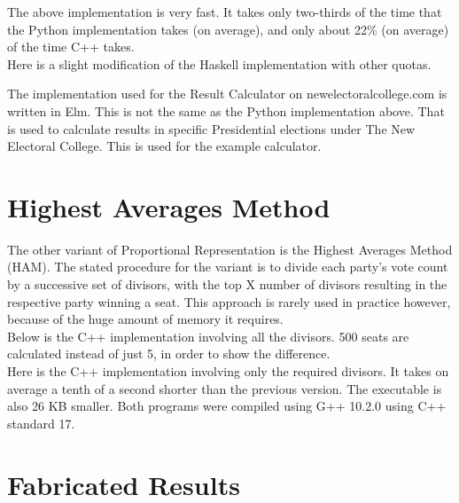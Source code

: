 \documentclass{article}
\begin{document}
    

    The above implementation is very fast. It takes only two-thirds of the time that the Python implementation takes (on average), and only about 22\% (on average) of the time C++ takes.\\

    Here is a slight modification of the Haskell implementation with other quotas.

    

    The implementation used for the Result Calculator on newelectoralcollege.com is written in Elm. This is not the same as the Python implementation above. That is used to calculate results in specific Presidential elections under The New Electoral College. This is used for the example calculator.

    

    \section{Highest Averages Method}

    The other variant of Proportional Representation is the Highest Averages Method (HAM). The stated procedure for the variant is to divide each party's vote count by a successive set of divisors, with the top X number of divisors resulting in the respective party winning a seat. This approach is rarely used in practice however, because of the huge amount of memory it requires. \\

    Below is the C++ implementation involving all the divisors. 500 seats are calculated instead of just 5, in order to show the difference. \\

    

    Here is the C++ implementation involving only the required divisors. It takes on average a tenth of a second shorter than the previous version. The executable is also 26 KB smaller. Both programs were compiled using G++ 10.2.0 using C++ standard 17. \\

    

    \section{Fabricated Results}
\end{document}
